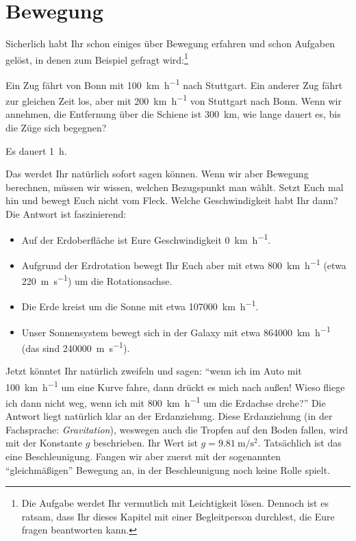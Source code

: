 \section{Bewegung}
\label{sec:physik:bewegung}

Sicherlich habt Ihr schon einiges über Bewegung erfahren und schon Aufgaben gelöst, in denen zum Beispiel gefragt wird:\footnote{%
    Die Aufgabe werdet Ihr vermutlich mit Leichtigkeit lösen. Dennoch ist es ratsam, dass Ihr dieses Kapitel mit einer Begleitperson durchlest, die Eure fragen beantworten kann.}

\begin{exercise}
    Ein Zug fährt von Bonn mit \qty{100}{\km\per\hour} nach Stuttgart. Ein anderer Zug fährt zur gleichen Zeit los, aber mit \qty{200}{\km\per\hour} von Stuttgart nach Bonn. Wenn wir annehmen, die Entfernung über die Schiene ist \qty{300}{\km}, wie lange dauert es, bis die Züge sich begegnen?
    \begin{solution}
        Es dauert \qty{1}{\hour}.
    \end{solution}
\end{exercise}
Das werdet Ihr natürlich sofort sagen können. Wenn wir aber Bewegung berechnen, müssen wir wissen, welchen Bezugspunkt man wählt. Setzt Euch mal hin und bewegt Euch nicht vom Fleck. Welche Geschwindigkeit habt Ihr dann? Die Antwort ist faszinierend:
\begin{itemize}
    \item Auf der Erdoberfläche ist Eure Geschwindigkeit \qty{0}{\km\per\hour}.
    \item Aufgrund der Erdrotation bewegt Ihr Euch aber mit etwa \qty{800}{\km\per\hour} (etwa \qty{220}{\meter\per\second}) um die Rotationsachse.
    \item Die Erde kreist um die Sonne mit etwa \qty{107000}{\km\per\hour}.
    \item Unser Sonnensystem bewegt sich in der Galaxy mit etwa \qty{864000}{\km\per\hour} (das sind \qty{240000}{\meter\per\second}).
\end{itemize}
Jetzt könntet Ihr natürlich zweifeln und sagen: ``wenn ich im Auto mit \qty{100}{\km\per\hour} um eine Kurve fahre, dann drückt es mich nach außen! Wieso fliege ich dann nicht weg, wenn ich mit \qty{800}{\km\per\hour} um die Erdachse drehe?'' Die Antwort liegt natürlich klar an der Erdanziehung. Diese Erdanziehung (in der Fachsprache: \emph{Gravitation}), weswegen auch die Tropfen auf den Boden fallen, wird mit der Konstante $g$ beschrieben. Ihr Wert ist $g = \qty{9,81}{\m\per\second^2}$. Tatsächlich ist das eine Beschleunigung. Fangen wir aber zuerst mit der sogenannten ``gleichmäßigen'' Bewegung an, in der Beschleunigung noch keine Rolle spielt.


